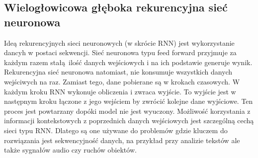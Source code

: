 \subsection{Wielogłowicowa głęboka rekurencyjna sieć neuronowa}
Ideą rekurencyjnych sieci neuronowych (w skrócie RNN) jest wykorzystanie dancyh w postaci sekwencji. 
Sieć neuronowa typu feed forward przyjmuje za każdym razem stałą ilość danych wejściowych i na ich podstawie generuje wynik. 
Rekurencyjna sieć neuronowa natomiast, nie konsumuje wszystkich danych wejściwych na raz. Zamiast tego,
dane pobierane są w krokach czasowych. W każdym kroku RNN wykonuje obliczenia i zwraca wyjście. 
To wyjście jest w następnym kroku łączone z jego wejściem by zwrócić kolejne dane wyjściowe. 
Ten proces jest powtarzany dopóki model nie jest wyuczony. Możliwość korzystania z 
informacji kontekstowych z poprzednich danych wejściowych jest szczególną cechą sieci typu RNN. Dlatego
są one używane do problemów gdzie kluczem do rozwiązania jest sekwencyjność danych, na przykład
przy analizie tekstów ale także sygnałów audio czy ruchów obiektów.

